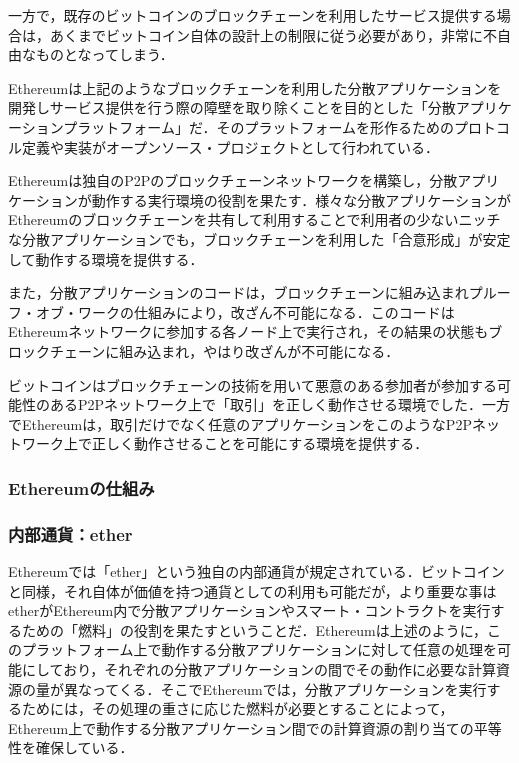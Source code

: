 一方で，既存のビットコインのブロックチェーンを利用したサービス提供する場合は，あくまでビットコイン自体の設計上の制限に従う必要があり，非常に不自由なものとなってしまう．

Ethereumは上記のようなブロックチェーンを利用した分散アプリケーションを開発しサービス提供を行う際の障壁を取り除くことを目的とした「分散アプリケーションプラットフォーム」だ．そのプラットフォームを形作るためのプロトコル定義や実装がオープンソース・プロジェクトとして行われている．

Ethereumは独自のP2Pのブロックチェーンネットワークを構築し，分散アプリケーションが動作する実行環境の役割を果たす．様々な分散アプリケーションがEthereumのブロックチェーンを共有して利用することで利用者の少ないニッチな分散アプリケーションでも，ブロックチェーンを利用した「合意形成」が安定して動作する環境を提供する．

また，分散アプリケーションのコードは，ブロックチェーンに組み込まれプルーフ・オブ・ワークの仕組みにより，改ざん不可能になる．このコードはEthereumネットワークに参加する各ノード上で実行され，その結果の状態もブロックチェーンに組み込まれ，やはり改ざんが不可能になる．

ビットコインはブロックチェーンの技術を用いて悪意のある参加者が参加する可能性のあるP2Pネットワーク上で「取引」を正しく動作させる環境でした．一方でEthereumは，取引だけでなく任意のアプリケーションをこのようなP2Pネットワーク上で正しく動作させることを可能にする環境を提供する．

\newpage

\subsubsection{Ethereumの仕組み}
\subsubsection*{内部通貨：ether}
Ethereumでは「ether」という独自の内部通貨が規定されている．ビットコインと同様，それ自体が価値を持つ通貨としての利用も可能だが，より重要な事はetherがEthereum内で分散アプリケーションやスマート・コントラクトを実行するための「燃料」の役割を果たすということだ．Ethereumは上述のように，このプラットフォーム上で動作する分散アプリケーションに対して任意の処理を可能にしており，それぞれの分散アプリケーションの間でその動作に必要な計算資源の量が異なってくる．そこでEthereumでは，分散アプリケーションを実行するためには，その処理の重さに応じた燃料が必要とすることによって，Ethereum上で動作する分散アプリケーション間での計算資源の割り当ての平等性を確保している．

